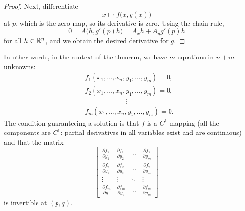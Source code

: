 \begin{proof}
Next, differentiate
\begin{equation*}
x\mapsto f\bigl(x,g(x)\bigr)
\end{equation*}
at $p$,
which is the zero map, so its derivative is zero.
Using the chain rule,
\begin{equation*}
0 = A\bigl(h,g'(p)h\bigr) = A_xh + A_yg'(p)h
\end{equation*}
for all $h \in {\mathbb{R}}^{n}$,
and we obtain the desired derivative for $g$.
\end{proof}

In other words, in the context of the theorem, we have
$m$ equations in $n+m$ unknowns:
\begin{align*}
& f_1 (x_1,\ldots,x_n,y_1,\ldots,y_m) = 0 , \\
& f_2 (x_1,\ldots,x_n,y_1,\ldots,y_m) = 0 , \\
& \qquad \qquad \qquad  \vdots \\
& f_m (x_1,\ldots,x_n,y_1,\ldots,y_m) = 0 .
\end{align*}
The condition guaranteeing a solution is that $f$ is a $C^1$ mapping
(all the components are
$C^1$: partial derivatives in all variables exist
and are continuous) and that the matrix
\begin{equation*}
\begin{bmatrix}
\frac{\partial f_1}{\partial y_1}
&
\frac{\partial f_1}{\partial y_2}
& \ldots &
\frac{\partial f_1}{\partial y_m}
\\[6pt]
\frac{\partial f_2}{\partial y_1}
&
\frac{\partial f_2}{\partial y_2}
& \ldots &
\frac{\partial f_2}{\partial y_m}
\\
\vdots & \vdots & \ddots & \vdots
\\
\frac{\partial f_m}{\partial y_1}
&
\frac{\partial f_m}{\partial y_2}
& \ldots &
\frac{\partial f_m}{\partial y_m}
\end{bmatrix}
\end{equation*}
is invertible at $(p,q)$.

